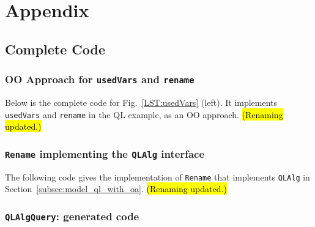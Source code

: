 \clearpage

\section{Appendix}\label{sec:appendix}

\subsection{Complete Code}

\subsubsection{OO Approach for \lstinline{usedVars} and \lstinline{rename}}\label{subsec:appendix_code_oo_approach}

Below is the complete code for Fig.~\ref{LST:usedVars} (left). It implements \lstinline{usedVars} and \lstinline{rename} in the QL example, as an OO approach.
\hl{(Renaming updated.)}


\subsubsection{\lstinline{Rename} implementing the \lstinline{QLAlg} interface}\label{subsec:appendix_code_rename}

The following code gives the implementation of \lstinline{Rename} that implements \lstinline{QLAlg} in Section~\ref{subsec:model_ql_with_oa}.
\hl{(Renaming updated.)}


\begin{comment}
\subsubsection{\lstinline{SetMonoid}}\label{subsec:appendix_code_setmonoid}

The implementation of \lstinline{SetMonoid} for Fig.~\ref{ql_with_oaframework} and Section~\ref{subsec:solvingfreevars}.

\end{comment}

\subsubsection{\lstinline{QLAlgQuery}: generated code}\label{subsec:appendix_code_qlalgquery}

